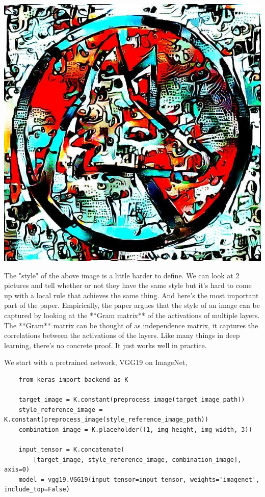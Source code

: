 \documentclass[graybox]{svmult}
\begin{document}
\includegraphics[width=\textwidth]{ref2.jpg}

The "style" of the above image is a little harder to define. We can look at 2 pictures and tell whether or not they have the same style but it's hard to come up with a local rule that achieves the same thing. And here's the most important part of the paper. Empirically, the paper argues that the style of an image can be captured by looking at the **Gram matrix** of the activations of multiple layers. The **Gram** matrix can be thought of as independence matrix, it captures the correlations between the activations of the layers. Like many things in deep learning, there's no concrete proof. It just works well in practice.

We start with a pretrained network, VGG19 on ImageNet,


\begin{verbatim}
    from keras import backend as K

    target_image = K.constant(preprocess_image(target_image_path))
    style_reference_image = K.constant(preprocess_image(style_reference_image_path))
    combination_image = K.placeholder((1, img_height, img_width, 3))

    input_tensor = K.concatenate(
        [target_image, style_reference_image, combination_image], axis=0)
    model = vgg19.VGG19(input_tensor=input_tensor, weights='imagenet', include_top=False)
\end{verbatim}
\end{document}
